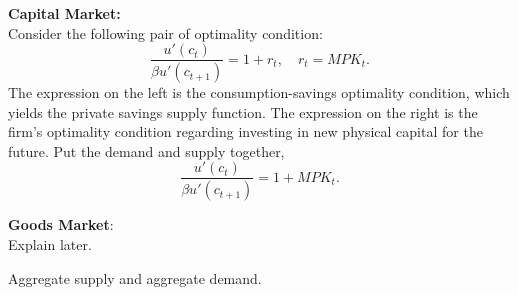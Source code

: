 \documentclass[10pt]{article}
\begin{document}
{\textbf {Capital Market:}}\\
Consider the following pair of optimality condition:
\begin{equation*}
\frac{u'(c_{t})}{\beta u'(c_{t + 1})} = 1 + r_{t}, \quad r_{t} = MPK_{t}.
\end{equation*}
The expression on the left is the consumption-savings optimality condition, which yields the
private savings supply function.
The expression on the right is the firm's optimality condition regarding investing in new
physical capital for the future.
Put the demand  and supply together,
\begin{equation*}
\frac{u'(c_{t})}{\beta u'(c_{t + 1})} = 1 + MPK_{t}.
\end{equation*}


{\textbf {Goods Market}}:\\
Explain later.

Aggregate supply and aggregate demand.






\end{document}
